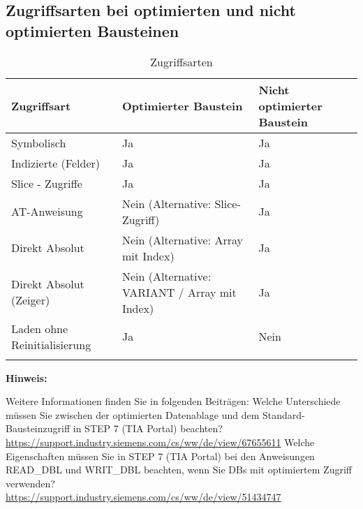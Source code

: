 \clearpage
\subsection{Zugriffsarten bei optimierten und nicht optimierten Bausteinen}\label{subsec:Zugriffsarten bei optimierten und nicht optimierten Bausteinen}
\begin{longtable}{| p{} | p{} | p{} |} %
    \hline
    \textbf{Zugriffsart} & \textbf{Optimierter Baustein} & \textbf{Nicht optimierter Baustein} \\    
    \hline
    Symbolisch & Ja & Ja\\    
    \hline
    Indizierte (Felder) & Ja & Ja\\
    \hline
    Slice - Zugriffe & Ja & Ja\\
    \hline
    AT-Anweisung & Nein (Alternative: Slice-Zugriff) & Ja\\
    \hline
    Direkt Absolut & Nein (Alternative: Array mit Index) & Ja\\
    \hline
    Direkt Absolut (Zeiger)& Nein (Alternative: VARIANT / Array mit Index) & Ja\\
    \hline
    Laden ohne Reinitialisierung& Ja & Nein\\
    \hline
    \caption{Zugriffsarten}\label{tab:Zugriffsarten} %
\end{longtable}

\noindent \textbf{Hinweis:}\par \noindent
Weitere Informationen finden Sie in folgenden Beiträgen:
Welche Unterschiede müssen Sie zwischen der optimierten Datenablage und dem Standard-Bausteinzugriff in STEP 7 (TIA Portal) beachten? \\
\url{https://support.industry.siemens.com/cs/ww/de/view/67655611}
\noindent 
Welche Eigenschaften müssen Sie in STEP 7 (TIA Portal) bei den Anweisungen 
\glqq READ\_DBL\grqq{} und \glqq WRIT\_DBL\grqq{} beachten, wenn Sie DBs mit optimiertem Zugriff verwenden? \\
\url{https://support.industry.siemens.com/cs/ww/de/view/51434747}


